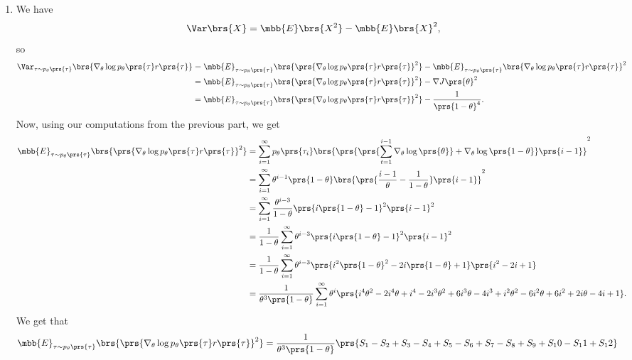 \documentclass[10pt]{article}
\theoremstyle{definition}
\begin{document}
\begin{enumerate}
\item
We have
\begin{align*}
\Var\brs{X} = \mbb{E}\brs{X^2} - \mbb{E}\brs{X}^2 \text{,}
\end{align*}
so
\begin{align*}
\Var_{\tau \sim p_\theta\prs{\tau}}\brs{\nabla_\theta \log p_\theta\prs{\tau} r\prs{\tau}} &=
\mbb{E}_{\tau \sim p_\theta\prs{\tau}}\brs{\prs{\nabla_\theta \log p_\theta\prs{\tau} r\prs{\tau}}^2}
- \mbb{E}_{\tau \sim p_\theta\prs{\tau}}\brs{\nabla_\theta \log p_\theta\prs{\tau} r\prs{\tau}}^2
\\&=
\mbb{E}_{\tau \sim p_\theta\prs{\tau}}\brs{\prs{\nabla_\theta \log p_\theta\prs{\tau} r\prs{\tau}}^2}
- \nabla J\prs{\theta}^2
\\&=
\mbb{E}_{\tau \sim p_\theta\prs{\tau}}\brs{\prs{\nabla_\theta \log p_\theta\prs{\tau} r\prs{\tau}}^2} - \frac{1}{\prs{1 - \theta}^4} \text{.}
\end{align*}
Now, using our computations from the previous part, we get
\begin{align*}
\mbb{E}_{\tau \sim p_\theta\prs{\tau}}\brs{\prs{\nabla_\theta \log p_\theta\prs{\tau} r\prs{\tau}}^2} &=
\sum_{i=1}^{\infty} p_\theta\prs{\tau_i} \brs{\prs{\prs{\sum_{t = 1}^{i-1} \nabla_\theta \log\prs{\theta}} + \nabla_\theta \log\prs{1 - \theta}} \prs{i-1}}^2
\\&=
\sum_{i=1}^{\infty} \theta^{i-1} \prs{1 - \theta} \brs{\prs{\frac{i - 1}{\theta} - \frac{1}{1 - \theta}} \prs{i-1}}^2
\\&=
\sum_{i=1}^{\infty} \frac{\theta^{i-3}}{1 - \theta} \prs{i \prs{1 - \theta} - 1}^2 \prs{i-1}^2
\\&=
\frac{1}{1 - \theta} \sum_{i=1}^{\infty} \theta^{i-3} \prs{i \prs{1 - \theta} - 1}^2 \prs{i-1}^2
\\&=
\frac{1}{1 - \theta} \sum_{i=1}^{\infty} \theta^{i-3} \prs{i^2 \prs{1-\theta}^2 - 2i\prs{1-\theta} + 1} \prs{i^2 -2i + 1}
\\&= 
\frac{1}{\theta^3\prs{1 - \theta}} \sum_{i=1}^{\infty} \theta^i \prs{i^4 \theta^2 -2i^4 \theta +i^4 - 2i^3 \theta^2 + 6i^3 \theta -4i^3 +i^2 \theta^2 - 6i^2 \theta +6 i^2 + 2i\theta -4i + 1} \text{.}
\end{align*}
We get that
\begin{align*}
\mbb{E}_{\tau \sim p_\theta\prs{\tau}}\brs{\prs{\nabla_\theta \log p_\theta\prs{\tau} r\prs{\tau}}^2} &= \frac{1}{\theta^3\prs{1 - \theta}} \prs{S_1 - S_2 + S_3 - S_4 + S_5 - S_6 + S_7 - S_8 + S_9 + S_10 - S_11 + S_12}
\end{align*}

\end{enumerate}
\end{document}
